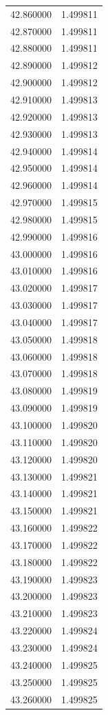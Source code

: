 \begin{tabular}{rr}
42.860000 & 1.499811 \\
42.870000 & 1.499811 \\
42.880000 & 1.499811 \\
42.890000 & 1.499812 \\
42.900000 & 1.499812 \\
42.910000 & 1.499813 \\
42.920000 & 1.499813 \\
42.930000 & 1.499813 \\
42.940000 & 1.499814 \\
42.950000 & 1.499814 \\
42.960000 & 1.499814 \\
42.970000 & 1.499815 \\
42.980000 & 1.499815 \\
42.990000 & 1.499816 \\
43.000000 & 1.499816 \\
43.010000 & 1.499816 \\
43.020000 & 1.499817 \\
43.030000 & 1.499817 \\
43.040000 & 1.499817 \\
43.050000 & 1.499818 \\
43.060000 & 1.499818 \\
43.070000 & 1.499818 \\
43.080000 & 1.499819 \\
43.090000 & 1.499819 \\
43.100000 & 1.499820 \\
43.110000 & 1.499820 \\
43.120000 & 1.499820 \\
43.130000 & 1.499821 \\
43.140000 & 1.499821 \\
43.150000 & 1.499821 \\
43.160000 & 1.499822 \\
43.170000 & 1.499822 \\
43.180000 & 1.499822 \\
43.190000 & 1.499823 \\
43.200000 & 1.499823 \\
43.210000 & 1.499823 \\
43.220000 & 1.499824 \\
43.230000 & 1.499824 \\
43.240000 & 1.499825 \\
43.250000 & 1.499825 \\
43.260000 & 1.499825 \\

\end{tabular}
